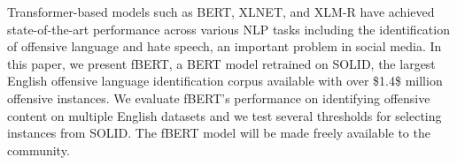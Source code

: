 Transformer-based models such as BERT, XLNET, and XLM-R have achieved state-of-the-art performance across various NLP tasks including the identification of offensive language and hate speech, an important problem in social media. In this paper, we present fBERT, a BERT model retrained on SOLID, the largest English offensive language identification corpus available with over \$1.4\$ million offensive instances. We evaluate fBERT's performance on identifying offensive content on multiple English datasets and we test several thresholds for selecting instances from SOLID. The fBERT model will be made freely available to the community.
